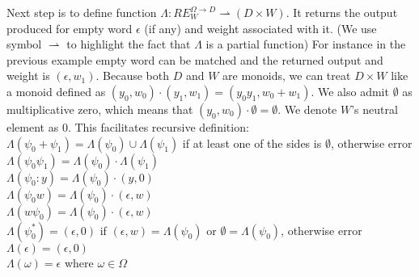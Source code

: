 Next step is to define function $\Lambda:RE_W^{\Omega\rightarrow D} \rightharpoonup ( D \times W)$. It returns the output produced for empty word $\epsilon$ (if any) and weight associated with it. (We use symbol $\rightharpoonup$ to highlight the fact that $\Lambda$ is a partial function) For instance in the previous example empty word can be matched and the returned output and weight is $(\epsilon,w_1)$. Because both $D$ and $W$ are monoids, we can treat $D \times W$ like a monoid defined as $(y_0,w_0)\cdot(y_1,w_1) = (y_0y_1,w_0+w_1)$. We also admit $\emptyset$ as multiplicative zero, which means that $(y_0,w_0)\cdot\emptyset=\emptyset$. We denote  $W$'s neutral element as $0$. This facilitates recursive definition: \\
$\Lambda(\psi_0+\psi_1) = \Lambda(\psi_0) \cup \Lambda(\psi_1)$ if at least one of the sides is $\emptyset$, otherwise error\\
$\Lambda(\psi_0\psi_1) =\Lambda(\psi_0) \cdot \Lambda(\psi_1)$ \\
$\Lambda(\psi_0 : y) = \Lambda(\psi_0) \cdot (y,0)$ \\
$\Lambda(\psi_0 w) = \Lambda(\psi_0) \cdot (\epsilon,w)$\\
$\Lambda(w \psi_0 ) =  \Lambda(\psi_0) \cdot (\epsilon,w)$ \\
$\Lambda(\psi_0^* ) = (\epsilon,0)$ if $(\epsilon,w) = \Lambda(\psi_0) $ or $\emptyset = \Lambda(\psi_0) $, otherwise error \\
$\Lambda(\epsilon) = (\epsilon,0)$\\
$\Lambda(\omega) = \epsilon$ where $\omega\in\Omega$

